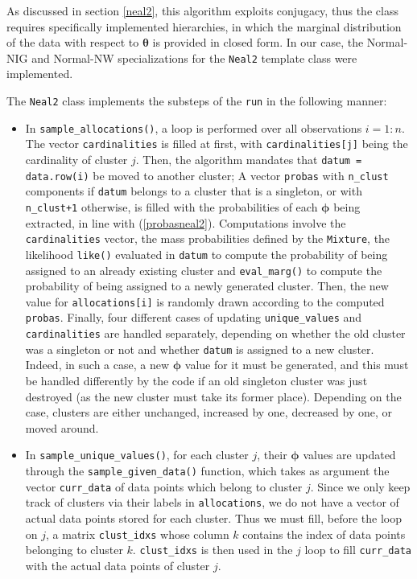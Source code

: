 As discussed in section \ref{neal2}, this algorithm exploits conjugacy, thus the class requires specifically implemented hierarchies, in which the marginal distribution of the data with respect to $\boldsymbol\theta$ is provided in closed form.
In our case, the Normal-NIG and Normal-NW specializations for the \verb|Neal2| template class were implemented.

The \verb|Neal2| class implements the substeps of the \verb|run| in the following manner:

\begin{itemize}

	\item In \verb|sample_allocations()|, a loop is performed over all observations $i=1:n$.
	The vector \verb|cardinalities| is filled at first, with \verb|cardinalities[j]| being the cardinality of cluster $j$.
	Then, the algorithm mandates that \verb|datum = data.row(i)| be moved to another cluster;
	A vector \verb|probas| with \verb|n_clust| components if \verb|datum| belongs to a cluster that is a singleton, or with \verb|n_clust+1| otherwise, is filled with the probabilities of each $\boldsymbol\phi$ being extracted, in line with (\ref{probasneal2}).
	Computations involve the \verb|cardinalities| vector, the mass probabilities defined by the \verb|Mixture|, the likelihood \verb|like()| evaluated in \verb|datum| to compute the probability of being assigned to an already existing cluster and \verb|eval_marg()| to compute the probability of being assigned to a newly generated cluster. Then, the new value for \verb|allocations[i]| is randomly drawn according to the computed \verb|probas|.
	Finally, four different cases of updating \verb|unique_values| and \verb|cardinalities| are handled separately, depending on whether the old cluster was a singleton or not and whether \verb|datum| is assigned to a new cluster.
	Indeed, in such a case, a new $\boldsymbol\phi$ value for it must be generated, and this must be handled differently by the code if an old singleton cluster was just destroyed (as the new cluster must take its former place).
	Depending on the case, clusters are either unchanged, increased by one, decreased by one, or moved around.
	
	\item In \verb|sample_unique_values()|, for each cluster $j$, their $\boldsymbol\phi$ values are updated through the \verb|sample_given_data()| function, which takes as argument the vector \verb|curr_data| of data points which belong to cluster $j$.
	Since we only keep track of clusters via their labels in \verb|allocations|, we do not have a vector of actual data points stored for each cluster.
	Thus we must fill, before the loop on $j$, a matrix \verb|clust_idxs| whose column $k$ contains the index of data points belonging to cluster $k$.
	\verb|clust_idxs| is then used in the $j$ loop to fill \verb|curr_data| with the actual data points of cluster $j$.

\end{itemize}


